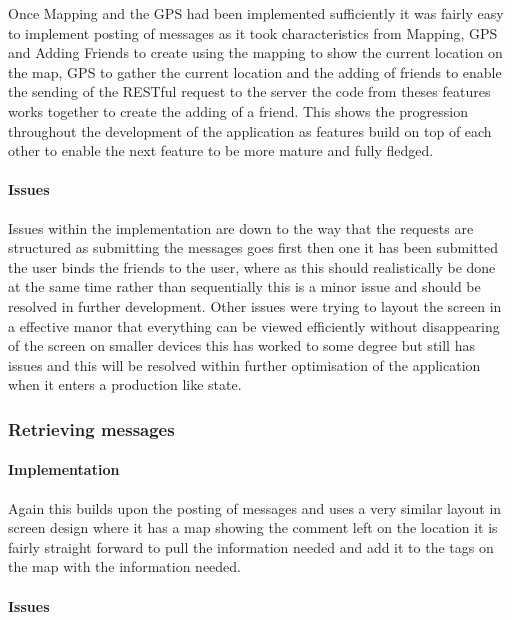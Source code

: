 Once Mapping and the GPS had been implemented sufficiently it was fairly easy to implement posting of messages as it took characteristics from Mapping, GPS and Adding Friends to create using the mapping to show the current location on the map, GPS to gather the current location and the adding of friends to enable the sending of the RESTful request to the server the code from theses features works together to create the adding of a friend. This shows the progression throughout the development of the application as features build on top of each other to enable the next feature to be more mature and fully fledged.

\paragraph*{Issues}

Issues within the implementation are down to the way that the requests are structured as submitting the messages goes first then one it has been submitted the user binds the friends to the user, where as this should realistically be done at the same time rather than sequentially this is a minor issue and should be resolved in further development. Other issues were trying to layout the screen in a effective manor that everything can be viewed efficiently without disappearing of the screen on smaller devices this has worked to some degree but still has issues and this will be resolved within further optimisation of the application when it enters a production like state.

\subsubsection*{Retrieving messages}

\paragraph*{Implementation}

Again this builds upon the posting of messages and uses a very similar layout in screen design where it has a map showing the comment left on the location it is fairly straight forward to pull the information needed and add it to the tags on the map with the information needed. 

\paragraph*{Issues}

